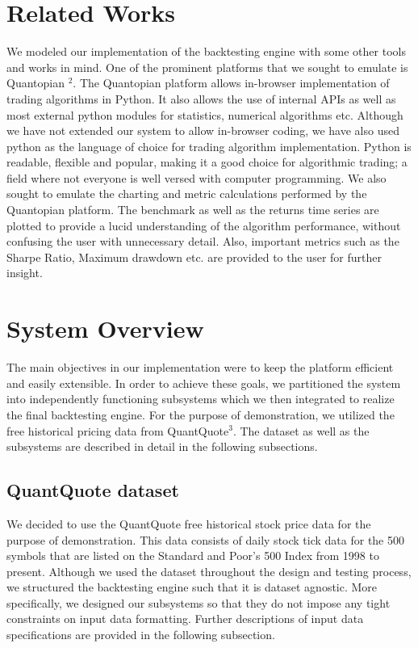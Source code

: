 \documentclass[10pt, conference, compsocconf]{IEEEtran}
\begin{document}


\section{Related Works}
We modeled our implementation of the backtesting engine with some other tools and works in mind. One of the prominent platforms that we sought to emulate is Quantopian $^2$. The Quantopian platform allows in-browser implementation of trading algorithms in Python. It also allows the use of internal APIs as well as most external python modules for statistics, numerical algorithms etc. Although we have not extended our system to allow in-browser coding, we have also used python as the language of choice for trading algorithm implementation. Python is readable, flexible and popular, making it a good choice for algorithmic trading; a field where not everyone is well versed with computer programming. We also sought to emulate the charting and metric calculations performed by the Quantopian platform. The benchmark as well as the returns time series are plotted to provide a lucid understanding of the algorithm performance, without confusing the user with unnecessary detail. Also, important metrics such as the Sharpe Ratio, Maximum drawdown etc. are provided to the user for further insight.

\section{System Overview}
The main objectives in our implementation were to keep the platform efficient and easily extensible. In order to achieve these goals, we partitioned the system into independently functioning subsystems which we then integrated to realize the final backtesting engine. For the purpose of demonstration, we utilized the free historical pricing data from QuantQuote$^3$. The dataset as well as the subsystems are described in detail in the following subsections.

\subsection{QuantQuote dataset}
We decided to use the QuantQuote free historical stock price data for the purpose of demonstration. This data consists of daily stock tick data for the 500 symbols that are listed on the Standard and Poor's 500 Index from 1998 to present. Although we used the dataset throughout the design and testing process, we structured the backtesting engine such that it is dataset agnostic. More specifically, we designed our subsystems so that they do not impose any tight constraints on input data formatting. Further descriptions of input data specifications are provided in the following subsection.
\end{document}
